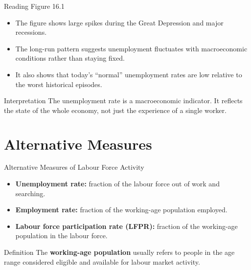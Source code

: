 \documentclass[aspectratio=169]{beamer}
\begin{document}
\begin{frame}{Reading Figure 16.1}
\transfade
\begin{itemize}
  \item The figure shows large spikes during the Great Depression and major recessions.
  \item The long-run pattern suggests unemployment fluctuates with macroeconomic conditions rather than staying fixed.
  \item It also shows that today's ``normal'' unemployment rates are low relative to the worst historical episodes.
\end{itemize}

\begin{block}{Interpretation}
The unemployment rate is a macroeconomic indicator. It reflects the state of the whole economy, not just the experience of a single worker.
\end{block}
\end{frame}

\section{Alternative Measures}

\begin{frame}{Alternative Measures of Labour Force Activity}
\transfade
\begin{itemize}
  \item \textbf{Unemployment rate:} fraction of the labour force out of work and searching.
  \item \textbf{Employment rate:} fraction of the working-age population employed.
  \item \textbf{Labour force participation rate (LFPR):} fraction of the working-age population in the labour force.
\end{itemize}

\begin{block}{Definition}
The \textbf{working-age population} usually refers to people in the age range considered eligible and available for labour market activity.
\end{block}
\end{frame}
\end{document}
